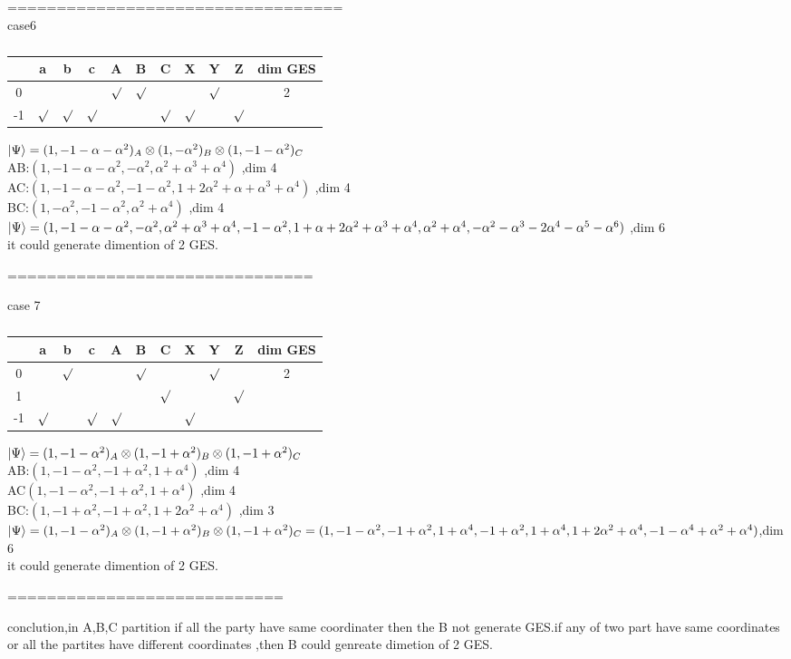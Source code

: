 \documentclass[12pt,twoside]{report}
\begin{document}
==================================\\
case6\\
	\begin{table}[ht]
	\centering
	\begin{tabular}{|c|c|c|c|c|c|c|c|c|c|c|}
		\hline
		& a & b  &  c & A & B & C & X & Y & Z & dim GES  \\
		\hline
		0	& & & & $\surd$&$\surd$ & & &$\surd$ &  & 2\\
		\hline
		-1 &$\surd$	& $\surd$&$\surd$ & & & $\surd$&$\surd$ & &$\surd$  &\\
		\hline 		
		
	\end{tabular}
	\caption{ }
\end{table}

$ \ket{\Psi}=(1,-1-\alpha-\alpha^{2})_{A}\otimes(1,-\alpha^{2})_{B}\otimes(1,-1-\alpha^{2})_{C} $\\
AB:$(1,-1-\alpha-\alpha^{2},-\alpha^{2},\alpha^{2}+\alpha^{3}+\alpha^{4})$ ,dim 4\\
AC:$(1,-1-\alpha-\alpha^{2},-1-\alpha^{2},1+2\alpha^{2}+\alpha+\alpha^{3}+\alpha^{4})$ ,dim 4\\
BC:$(1,-\alpha^{2},-1-\alpha^{2},\alpha^{2}+\alpha^{4})$ ,dim 4\\

$ \ket{\Psi}=(1,-1-\alpha-\alpha^{2},-\alpha^{2},\alpha^{2}+\alpha^{3}+\alpha^{4},-1-\alpha^{2},1+\alpha+2\alpha^{2}+\alpha^{3}+\alpha^{4},\alpha^{2}+\alpha^{4},-\alpha^{2}-\alpha^{3}-2\alpha^{4}-\alpha^{5}-\alpha^{6}) $ ,dim 6\\
it could generate dimention of 2 GES.

===============================



case 7\\
\begin{table}[ht]
	\centering
	\begin{tabular}{|c|c|c|c|c|c|c|c|c|c|c|}
		\hline
		& a & b  &  c & A & B & C & X & Y & Z & dim GES  \\
		\hline
		0	& &$\surd$ & & &$\surd$ & & &$\surd$ &  & 2\\
		\hline
		1 &	& & & & & $\surd$& & &$\surd$  &\\
		\hline 		
			-1 &$\surd$	& &$\surd$ & $\surd$& & & $\surd$& &  &\\
		\hline 		
	\end{tabular}
	\caption{ }
\end{table}
$ \ket{\Psi}=(1,-1-\alpha^{2})_{A}\otimes(1,-1+\alpha^{2})_{B}\otimes(1,-1+\alpha^{2})_{C} $\\
AB:$(1,-1-\alpha^{2},-1+\alpha^{2},1+\alpha^{4})$ ,dim 4\\
AC$(1,-1-\alpha^{2},-1+\alpha^{2},1+\alpha^{4})$ ,dim 4\\
BC:$(1,-1+\alpha^{2},-1+\alpha^{2},1+2\alpha^{2}+\alpha^{4})$ ,dim 3\\
$ \ket{\Psi}=(1,-1-\alpha^{2})_{A}\otimes(1,-1+\alpha^{2})_{B}\otimes(1,-1+\alpha^{2})_{C}=(1,-1-\alpha^{2},-1+\alpha^{2},1+\alpha^{4},-1+\alpha^{2},1+\alpha^{4},1+2\alpha^{2}+\alpha^{4},-1-\alpha^{4}+\alpha^{2}+\alpha^{4}) $,dim 6 \\
it could generate dimention of 2 GES.

============================

conclution,in A,B,C partition if all the party have same coordinater then the B not generate GES.if any of two part have same  coordinates or all the partites have  different  coordinates ,then B could genreate dimetion of 2 GES.\\
\end{document}
